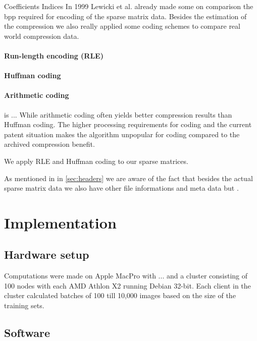Coefficients
Indices
In 1999 Lewicki et al.\cite{Lewicki1999} already made some on comparison 
the bpp required for encoding of the sparse matrix data. Besides the estimation
of the compression we also really applied some coding schemes to compare real
world compression data.
\cite{Murray2006}

\paragraph{Run-length encoding (RLE)}
\paragraph{Huffman coding}
\paragraph{Arithmetic coding} is ...
While arithmetic coding often yields better compression results than Huffman
coding. The higher processing requirements for coding and the current patent
situation makes the algorithm unpopular for coding compared to the archived
compression benefit.

We apply RLE and Huffman coding to our sparse matrices. 


As mentioned in in \ref{sec:headers} we are aware of the fact that besides
the actual sparse matrix data we also have other file informations and meta
data but .  



\section{Implementation}
%

\subsection*{Hardware setup}
Computations were made on Apple MacPro with ... 
and a cluster consisting of 100 nodes with each AMD Athlon X2  running Debian 32-bit. Each client in the cluster calculated batches of
100 till 10,000 images based on the size of the training sets.

\subsection*{Software}


